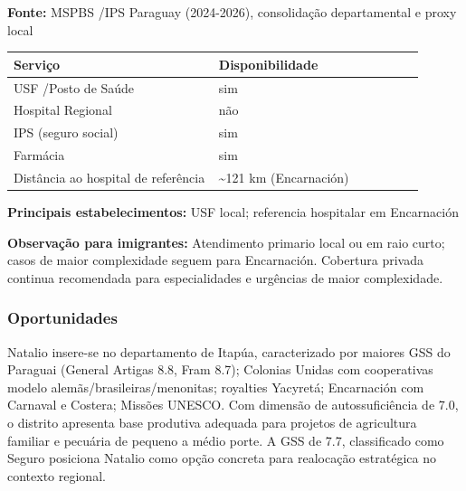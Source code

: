 \textbf{Fonte:} MSPBS /\allowbreak  IPS Paraguay (2024-2026), consolidação
departamental e proxy local

{\def\LTcaptype{none} %
\begin{longtable}{@{}>{\raggedright\arraybackslash}p{0.45\linewidth} >{\raggedright\arraybackslash}p{0.45\linewidth}@{}}
\toprule\noalign{}
Serviço & Disponibilidade \\
\midrule\noalign{}
\endhead
\bottomrule\noalign{}
\endlastfoot
USF /\allowbreak  Posto de Saúde & sim \\
Hospital Regional & não \\
IPS (seguro social) & sim \\
Farmácia & sim \\
Distância ao hospital de referência & \textasciitilde121 km
(Encarnación) \\
\end{longtable}
}

\textbf{Principais estabelecimentos:} USF local; referencia hospitalar
em Encarnación

\textbf{Observação para imigrantes:} Atendimento primario local ou em
raio curto; casos de maior complexidade seguem para Encarnación.
Cobertura privada continua recomendada para especialidades e urgências
de maior complexidade.
\newpage

\subsubsection*{Oportunidades}\label{oport-natalio-0710}
Natalio insere-se no departamento de Itapúa, caracterizado por maiores GSS do Paraguai (General Artigas 8.8, Fram 8.7); Colonias Unidas com cooperativas modelo alemãs/brasileiras/menonitas; royalties Yacyretá; Encarnación com Carnaval e Costera; Missões UNESCO. Com dimensão de autossuficiência de 7.0, o distrito apresenta base produtiva adequada para projetos de agricultura familiar e pecuária de pequeno a médio porte. A GSS de 7.7, classificado como Seguro posiciona Natalio como opção concreta para realocação estratégica no contexto regional.

